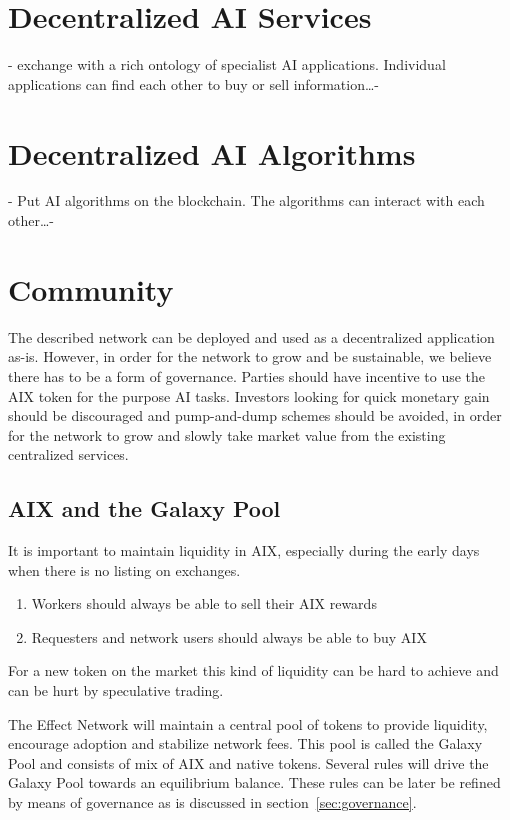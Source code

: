 \documentclass{article}
\begin{document}
\section{Decentralized AI Services}
\label{sec:phase2}
- exchange with a rich ontology of specialist AI applications. Individual applications can find each other to buy or sell information\dots -

\section{Decentralized AI Algorithms}
\label{sec:phase3}
- Put AI algorithms on the blockchain. The algorithms can interact with each other\dots -

\section{Community}
The described network can be deployed and used as a decentralized
application as-is. However, in order for the network to grow and be
sustainable, we believe there has to be a form of governance. Parties
should have incentive to use the AIX token for the purpose AI
tasks. Investors looking for quick monetary gain should be discouraged
and pump-and-dump schemes should be avoided, in order for the network
to grow and slowly take market value from the existing centralized
services.

\subsection{AIX and the Galaxy Pool}
It is important to maintain liquidity in AIX, especially during the
early days when there is no listing on exchanges. 

\begin{enumerate}
\item Workers should always be able to sell their AIX rewards
\item Requesters and network users should always be able to buy AIX
\end{enumerate}

For a new token on the market this kind of liquidity can be hard to
achieve and can be hurt by speculative trading.

The Effect Network will maintain a central pool of tokens to provide
liquidity, encourage adoption and stabilize network fees. This pool is
called the Galaxy Pool and consists of mix of AIX and native
tokens. Several rules will drive the Galaxy Pool towards an
equilibrium balance. These rules can be later be refined by means of
governance as is discussed in section~\ref{sec:governance}.
\end{document}
